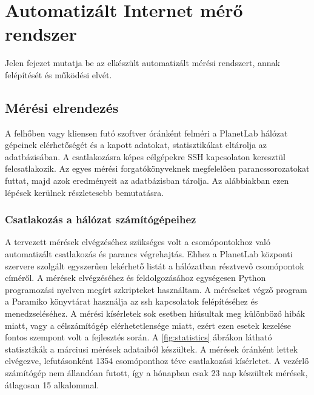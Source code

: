 \chapter{Automatizált Internet mérő rendszer}

Jelen fejezet mutatja be az elkészült automatizált mérési rendszert, annak felépítését és működési elvét.

\section{Mérési elrendezés}

A felhőben vagy kliensen futó szoftver óránként felméri a PlanetLab hálózat gépeinek elérhetőségét és a kapott adatokat, statisztikákat eltárolja az adatbázisában. A csatlakozásra képes célgépekre SSH kapcsolaton keresztül felcsatlakozik. Az egyes mérési forgatókönyveknek megfelelően parancssorozatokat futtat, majd azok eredményeit az adatbázisban tárolja.
Az alábbiakban ezen lépések kerülnek részletesebb bemutatásra.

\subsection{Csatlakozás a hálózat számítógépeihez}

A tervezett mérések elvégzéséhez szükséges volt a csomópontokhoz való automatizált csatlakozás és parancs végrehajtás. Ehhez a PlanetLab központi szervere szolgált egyszerűen lekérhető listát a hálózatban résztvevő csomópontok címéről. A mérések elvégzéséhez és feldolgozásához egységesen Python programozási nyelven megírt szkripteket használtam. A méréseket végző 
program a Paramiko\cite{paramiko} könyvtárat használja az ssh kapcsolatok felépítéséhez és menedzseléséhez. A mérési kísérletek sok esetben hiúsultak meg különböző hibák miatt, vagy a célszámítógép elérhetetlensége miatt, ezért ezen esetek kezelése fontos szempont volt a fejlesztés során. A \ref{fig:statistics} ábrákon látható statisztikák a márciusi mérések adataiból készültek. A mérések óránként lettek elvégezve, lefutásonként 1354 csomóponthoz téve csatlakozási kísérletet. A vezérlő számítógép nem állandóan futott, így a hónapban csak 23 nap készültek mérések, átlagosan 15 alkalommal.



